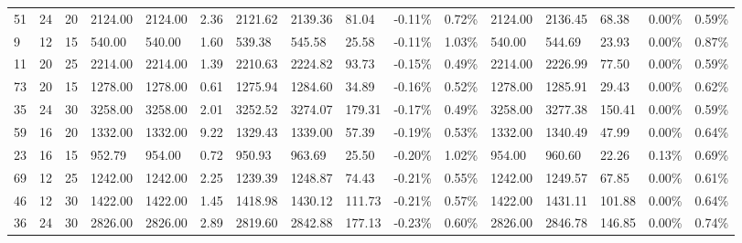 \begin{longtable}{l|ll|lll|lllll|lllll}
   51 & 24                         & 20                         & 2124.00                   & 2124.00     & 2.36                & 2121.62 & 2139.36 & 81.04  & -0.11\% & 0.72\% & 2124.00 & 2136.45 & 68.38  & 0.00\%  & 0.59\% \\
   9  & 12                         & 15                         & 540.00                    & 540.00      & 1.60                & 539.38  & 545.58  & 25.58  & -0.11\% & 1.03\% & 540.00  & 544.69  & 23.93  & 0.00\%  & 0.87\% \\
   11 & 20                         & 25                         & 2214.00                   & 2214.00     & 1.39                & 2210.63 & 2224.82 & 93.73  & -0.15\% & 0.49\% & 2214.00 & 2226.99 & 77.50  & 0.00\%  & 0.59\% \\
   73 & 20                         & 15                         & 1278.00                   & 1278.00     & 0.61                & 1275.94 & 1284.60 & 34.89  & -0.16\% & 0.52\% & 1278.00 & 1285.91 & 29.43  & 0.00\%  & 0.62\% \\
   35 & 24                         & 30                         & 3258.00                   & 3258.00     & 2.01                & 3252.52 & 3274.07 & 179.31 & -0.17\% & 0.49\% & 3258.00 & 3277.38 & 150.41 & 0.00\%  & 0.59\% \\
   59 & 16                         & 20                         & 1332.00                   & 1332.00     & 9.22                & 1329.43 & 1339.00 & 57.39  & -0.19\% & 0.53\% & 1332.00 & 1340.49 & 47.99  & 0.00\%  & 0.64\% \\
   23 & 16                         & 15                         & 952.79                    & 954.00      & 0.72                & 950.93  & 963.69  & 25.50  & -0.20\% & 1.02\% & 954.00  & 960.60  & 22.26  & 0.13\%  & 0.69\% \\
   69 & 12                         & 25                         & 1242.00                   & 1242.00     & 2.25                & 1239.39 & 1248.87 & 74.43  & -0.21\% & 0.55\% & 1242.00 & 1249.57 & 67.85  & 0.00\%  & 0.61\% \\
   46 & 12                         & 30                         & 1422.00                   & 1422.00     & 1.45                & 1418.98 & 1430.12 & 111.73 & -0.21\% & 0.57\% & 1422.00 & 1431.11 & 101.88 & 0.00\%  & 0.64\% \\
   36 & 24                         & 30                         & 2826.00                   & 2826.00     & 2.89                & 2819.60 & 2842.88 & 177.13 & -0.23\% & 0.60\% & 2826.00 & 2846.78 & 146.85 & 0.00\%  & 0.74\% \\

\end{longtable}
